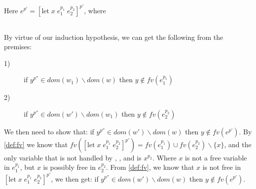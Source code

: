 \item[\runa{Let}] Here $e^{p'}=[\mbox{let}\;x\;e_1^{p_1}\;e_2^{p_2}]^{p'}$, where
\begin{figure}[H]
	\setlength\tabcolsep{8pt}
	\begin{tabular}{l}
		
	\end{tabular}
\end{figure}
By virtue of our induction hypothesis, we can get the following from the premises:
\begin{description}
	\item[1)] if $y^{p''}\in dom(w_1)\backslash dom(w)$ then $y\notin fv(e_1^{p_1})$
	\item[2)] if $y^{p''}\in dom(w')\backslash dom(w_1)$ then $y\notin fv(e_2^{p_2})$
\end{description}
We then need to show that: if $y^{p''}\in dom(w')\backslash dom(w)$ then $y\notin fv(e^{p'})$.
By \cref{def:fv} we know that $fv([\mbox{let}\;x\;e_1^{p_1}\;e_2^{p_2}]^{p'})=fv(e_1^{p_1})\cup fv(e_2^{p_2})\backslash\{x\}$, and the only variable that is not handled by , , and  is $x^{p_2}$.
Where $x$ is not a free variable in $e_1^{p_1}$, but $x$ is possibly free in $e_2^{p_2}$.
From \cref{def:fv}, we know that $x$ is not free in $[\mbox{let}\;x\;e_1^{p_1}\;e_2^{p_2}]^{p'}$, we then get: if $y^{p''}\in dom(w')\backslash dom(w)$ then $y\notin fv(e^{p'})$.
